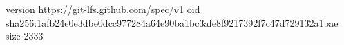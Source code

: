 version https://git-lfs.github.com/spec/v1
oid sha256:1afb24e0e3dbe0dcc977284a64e90ba1bc3afe8f9217392f7c47d729132a1bae
size 2333
